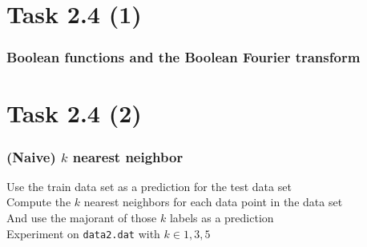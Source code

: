 \documentclass{beamer}
\begin{document}
\section{Task 2.4 (1)}
\begin{frame}
	\frametitle{Boolean functions and the Boolean Fourier transform}
\end{frame}
\section{Task 2.4 (2)}

\begin{frame}
	\frametitle{(Naive) $k$ nearest neighbor}
	Use the train data set as a prediction for the test data set \\\medskip
	Compute the $k$ nearest neighbors for each data point in the data set \\\medskip
	And use the majorant of those $k$ labels as a prediction \\\medskip
	Experiment on \texttt{data2.dat} with $k \in {1,3,5}$
\end{frame}
\end{document}
